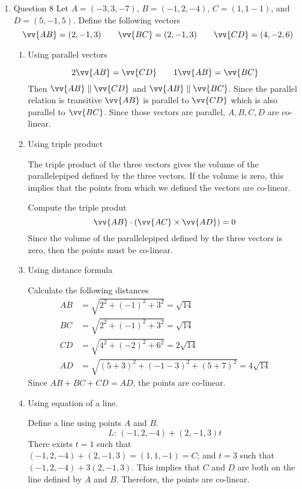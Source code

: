 \documentclass[11pt]{article}
\begin{document}
\begin{enumerate}
    \item Question 8
    Let $A=(-3,3,-7)$, $B=(-1,2,-4)$, $C=(1,1-1)$, and $D=(5,-1,5)$. Define the following vectors
    $$
    \vv{AB} = (2,-1,3) \qquad \vv{BC}=(2,-1,3) \qquad \vv{CD}=(4,-2,6)
    $$
    \begin{enumerate}
        \item Using parallel vectors
        
        $$
        2\vv{AB}=\vv{CD} \qquad 1\vv{AB}=\vv{BC}
        $$
        Then $\vv{AB} \parallel \vv{CD}$ and $\vv{AB} \parallel \vv{BC}$. Since the parallel relation is transitive $\vv{AB}$ is parallel to $\vv{CD}$ which is also parallel to $\vv{BC}$. Since those vectors are parallel, $A,B,C,D$ are co-linear.
        
        \item Using triple product
        
        The triple product of the three vectors gives the volume of the parallelepiped defined by the three vectors. If the volume is zero, this implies that the points from which we defined the vectors are co-linear.
        
        Compute the triple produt
        $$
        \vv{AB} \cdot (\vv{AC} \times \vv{AD}) = 0
        $$
        Since the volume of the parallelepiped defined by the three vectors is zero, then the points must be co-linear.
        
        \item Using distance formula
        
        Calculate the following distances
        \begin{align*}
            AB &= \sqrt{2^2+(-1)^2+3^2} = \sqrt{14} \\
            BC &= \sqrt{2^2 + (-1)^2 + 3^2} = \sqrt{14} \\
            CD &= \sqrt{4^2+(-2)^2+6^2} = 2\sqrt{14} \\
            AD &= \sqrt{(5+3)^2 + (-1-3)^2 +(5+7)^2} = 4\sqrt{14}
        \end{align*}
        Since $AB+BC+CD=AD$, the points are co-linear.
        
        \item Using equation of a line.
        
        Define a line using points $A$ and $B$.
        $$
        L:\, (-1,2,-4)+(2,-1,3)t
        $$
        There exists $t=1$ such that $(-1,2,-4)+(2,-1,3)=(1,1,-1)=C$; and $t=3$ such that $(-1,2,-4)+3(2,-1,3)$. This implies that $C$ and $D$ are both on the line defined by $A$ and $B$. Therefore, the points are co-linear.
    \end{enumerate}
\end{enumerate}
\end{document}
